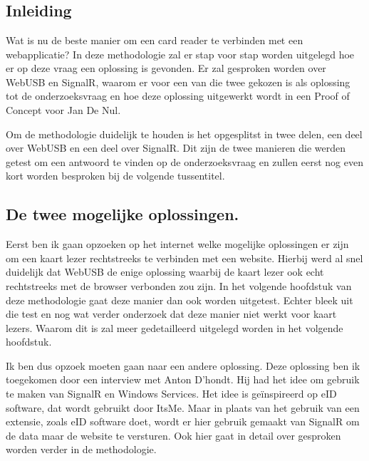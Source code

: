 \graphicspath{{graphics/}}
\chapter{}%
\label{ch:methodologie}

\section{Inleiding}
Wat is nu de beste manier om een card reader te verbinden met een webapplicatie? In deze methodologie zal er stap voor stap worden uitgelegd hoe er op deze vraag een oplossing is gevonden. Er zal gesproken worden over WebUSB en SignalR, waarom er voor een van die twee gekozen is als oplossing tot de onderzoeksvraag en hoe deze oplossing uitgewerkt wordt in een Proof of Concept voor Jan De Nul. 

Om de methodologie duidelijk te houden is het opgesplitst in twee delen, een deel over WebUSB en een deel over SignalR. Dit zijn de twee manieren die werden getest om een antwoord te vinden op de onderzoeksvraag en zullen eerst nog even kort worden besproken bij de volgende tussentitel. 


\section{De twee mogelijke oplossingen. }
Eerst ben ik gaan opzoeken op het internet welke mogelijke oplossingen er zijn om een kaart lezer rechtstreeks te verbinden met een website. Hierbij werd al snel duidelijk dat WebUSB de enige oplossing waarbij de kaart lezer ook echt rechtstreeks met de browser verbonden zou zijn. In het volgende hoofdstuk van deze methodologie gaat deze manier dan ook worden uitgetest. Echter bleek uit die test en nog wat verder onderzoek dat deze manier niet werkt voor kaart lezers. Waarom dit is zal meer gedetailleerd uitgelegd worden in het volgende hoofdstuk. 

Ik ben dus opzoek moeten gaan naar een andere oplossing. Deze oplossing ben ik toegekomen door een interview met Anton D’hondt. Hij had het idee om gebruik te maken van SignalR en Windows Services. Het idee is geïnspireerd op eID software, dat wordt gebruikt door ItsMe. Maar in plaats van het gebruik van een extensie, zoals eID software doet, wordt er hier gebruik gemaakt van SignalR om de data maar de website te versturen. Ook hier gaat in detail over gesproken worden verder in de methodologie. 



